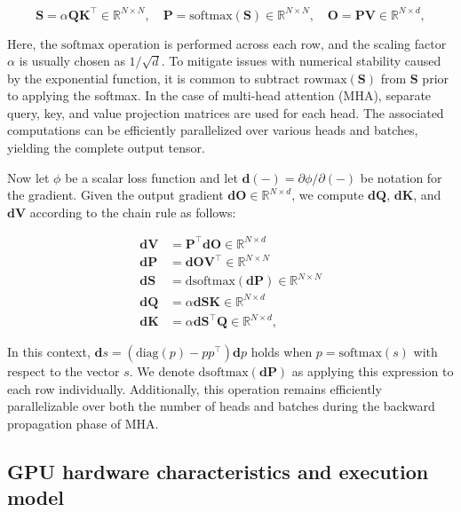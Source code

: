 \begin{equation*}
  \mathbf{S} = \alpha \mathbf{Q} \mathbf{K}^\top \in \mathbb{R}^{N \times N}, \quad \mathbf{P} = \mathrm{softmax}(\mathbf{S}) \in \mathbb{R}^{N \times N}, \quad \mathbf{O} = \mathbf{P}\mathbf{V} \in \mathbb{R}^{N \times d},
\end{equation*}

Here, the $\mathrm{softmax}$ operation is performed across each row, and the scaling factor $\alpha$ is usually chosen as $1/\sqrt{d}$. To mitigate issues with numerical stability caused by the exponential function, it is common to subtract $\mathrm{rowmax}(\mathbf{S})$ from $\mathbf{S}$ prior to applying the softmax. In the case of multi-head attention (MHA), separate query, key, and value projection matrices are used for each head. The associated computations can be efficiently parallelized over various heads and batches, yielding the complete output tensor.

Now let $\phi$ be a scalar loss function and let $\mathbf{d}(-) = \partial \phi / \partial (-)$ be notation for the gradient. Given the output gradient $\mathbf{dO} \in \mathbb{R}^{N \times d}$, we compute $\mathbf{dQ}$, $\mathbf{dK}$, and $\mathbf{dV}$ according to the chain rule as follows:

\begin{align*}
  \mathbf{dV} &= \mathbf{P}^\top \mathbf{dO} \in \mathbb{R}^{N \times d} \\
  \mathbf{dP} &= \mathbf{dO} \mathbf{V}^\top \in \mathbb{R}^{N \times N} \\
  \mathbf{dS} &= \mathrm{dsoftmax} (\mathbf{dP}) \in \mathbb{R}^{N \times N} \\
  \mathbf{dQ} &= \alpha \mathbf{dS} \mathbf{K} \in \mathbb{R}^{N \times d} \\
  \mathbf{dK} &= \alpha \mathbf{dS}^\top \mathbf{Q} \in \mathbb{R}^{N \times d},
\end{align*}

In this context, $\mathbf{d}s = (\mathrm{diag}(p) - p p^\top)\mathbf{d}p$ holds when $p = \mathrm{softmax}(s)$ with respect to the vector $s$. We denote $\mathrm{dsoftmax}(\mathbf{dP})$ as applying this expression to each row individually. Additionally, this operation remains efficiently parallelizable over both the number of heads and batches during the backward propagation phase of MHA.

\subsection{GPU hardware characteristics and execution model}
\label{subsec:hardware}

